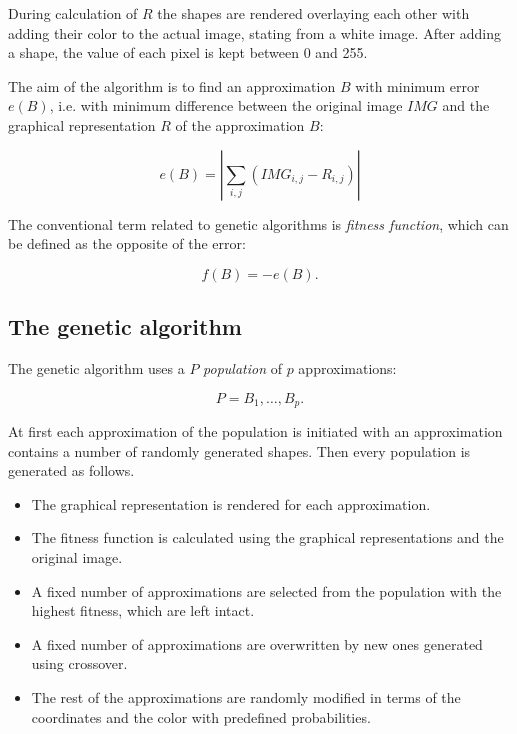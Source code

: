 \documentclass[conference]{IEEEtran}
\begin{document}
During calculation of $R$ the shapes are rendered overlaying each other with
adding their color to the actual image, stating from a white image. After
adding a shape, the value of each pixel is kept between 0 and 255.

The aim of the algorithm is to find an approximation $B$ with minimum error $e(B)$, i.e.
with minimum difference between the original image $IMG$ and the graphical
representation $R$ of the approximation $B$:

\begin{equation}
  e(B) = \left\lvert \sum_{i,j}(IMG_{i,j}-R_{i,j}) \right\rvert
\end{equation}

The conventional term related to genetic algorithms is \emph{fitness function}, which
can be defined as the opposite of the error:

\begin{equation}
  f(B) = -e(B).
\end{equation}

\subsection{The genetic algorithm}

The genetic algorithm uses a $P$ \emph{population} of $p$ approximations:

\begin{equation}
  P = {B_1, \dots, B_p}.
\end{equation}

At first each approximation of the population is initiated with an approximation
contains a number of randomly generated shapes. Then every population is generated
as follows.

\begin{itemize}
  \item{The graphical representation is rendered for each approximation.}
  \item{The fitness function is calculated using the graphical representations and the original image.}
  \item{A fixed number of approximations are selected from the population with the highest fitness, which are left intact.}
  \item{A fixed number of approximations are overwritten by new ones generated using crossover.}
  \item{The rest of the approximations are randomly modified in terms of the coordinates and the color with predefined probabilities.}
\end{itemize}
\end{document}
